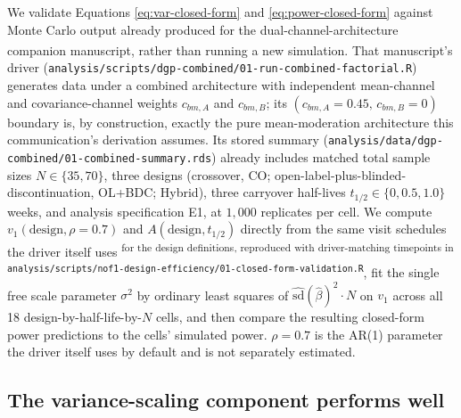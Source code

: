 \documentclass[
  11pt,
]{article}
\begin{document}
We validate Equations \eqref{eq:var-closed-form} and
\eqref{eq:power-closed-form} against Monte Carlo output already
produced for the dual-channel-architecture companion manuscript\textsuperscript{}, rather than running a new simulation. That
manuscript's driver
(\texttt{analysis/scripts/dgp-combined/01-run-combined-factorial.R})
generates data under a combined architecture with independent
mean-channel and covariance-channel weights \(c_{bm,A}\) and
\(c_{bm,B}\); its \((c_{bm,A}=0.45,\, c_{bm,B}=0)\) boundary is, by
construction, exactly the pure mean-moderation architecture this
communication's derivation assumes. Its stored summary
(\texttt{analysis/data/dgp-combined/01-combined-summary.rds}) already
includes matched total sample sizes \(N \in \{35, 70\}\), three designs
(crossover, CO; open-label-plus-blinded-discontinuation, OL+BDC;
Hybrid), three carryover half-lives \(t_{1/2}\in\{0, 0.5, 1.0\}\)
weeks, and analysis specification E1, at \(1{,}000\) replicates per
cell. We compute \(v_1(\mathrm{design}, \rho{=}0.7)\) and
\(A(\mathrm{design}, t_{1/2})\) directly from the same visit schedules
the driver itself uses\textsuperscript{ for the design
definitions, reproduced with driver-matching timepoints in
\texttt{analysis/scripts/nof1-design-efficiency/01-closed-form-validation.R}},
fit the single free scale parameter \(\sigma^2\) by ordinary least
squares of \(\widehat{\mathrm{sd}}(\hat\beta)^2 \cdot N\) on \(v_1\)
across all 18 design-by-half-life-by-\(N\) cells, and then compare the
resulting closed-form power predictions to the cells' simulated
power. \(\rho=0.7\) is the AR(1) parameter the driver itself uses by
default and is not separately estimated.

\subsection{The variance-scaling component performs well}\label{the-variance-scaling-component-performs-well}
\end{document}
